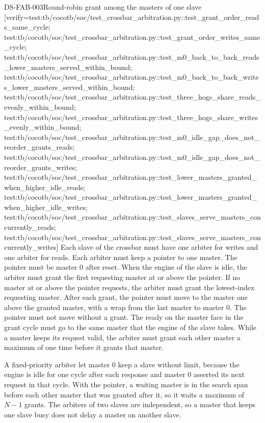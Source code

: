 \begin{requirement}{DS-FAB-003}{Round-robin grant among the masters of one slave}
[verify={test:tb/cocotb/soc/test_crossbar_arbitration.py::test_grant_order_reads_same_cycle; test:tb/cocotb/soc/test_crossbar_arbitration.py::test_grant_order_writes_same_cycle; test:tb/cocotb/soc/test_crossbar_arbitration.py::test_m0_back_to_back_reads_lower_masters_served_within_bound; test:tb/cocotb/soc/test_crossbar_arbitration.py::test_m0_back_to_back_writes_lower_masters_served_within_bound; test:tb/cocotb/soc/test_crossbar_arbitration.py::test_three_hogs_share_reads_evenly_within_bound; test:tb/cocotb/soc/test_crossbar_arbitration.py::test_three_hogs_share_writes_evenly_within_bound; test:tb/cocotb/soc/test_crossbar_arbitration.py::test_m0_idle_gap_does_not_reorder_grants_reads; test:tb/cocotb/soc/test_crossbar_arbitration.py::test_m0_idle_gap_does_not_reorder_grants_writes; test:tb/cocotb/soc/test_crossbar_arbitration.py::test_lower_masters_granted_when_higher_idle_reads; test:tb/cocotb/soc/test_crossbar_arbitration.py::test_lower_masters_granted_when_higher_idle_writes; test:tb/cocotb/soc/test_crossbar_arbitration.py::test_slaves_serve_masters_concurrently_reads; test:tb/cocotb/soc/test_crossbar_arbitration.py::test_slaves_serve_masters_concurrently_writes}]
Each slave of the crossbar must have one arbiter for writes and one arbiter for reads. Each arbiter must keep a pointer to one master. The pointer must be master 0 after reset. When the engine of the slave is idle, the arbiter must grant the first requesting master at or above the pointer. If no master at or above the pointer requests, the arbiter must grant the lowest-index requesting master. After each grant, the pointer must move to the master one above the granted master, with a wrap from the last master to master 0. The pointer must not move without a grant. The ready on the master face in the grant cycle must go to the same master that the engine of the slave takes. While a master keeps its request valid, the arbiter must grant each other master a maximum of one time before it grants that master.
\end{requirement}
\begin{rationale}
A fixed-priority arbiter let master 0 keep a slave without limit, because the engine is idle for one cycle after each response and master 0 asserted its next request in that cycle. With the pointer, a waiting master is in the search span before each other master that was granted after it, so it waits a maximum of $N-1$ grants. The arbiters of two slaves are independent, so a master that keeps one slave busy does not delay a master on another slave.
\end{rationale}
